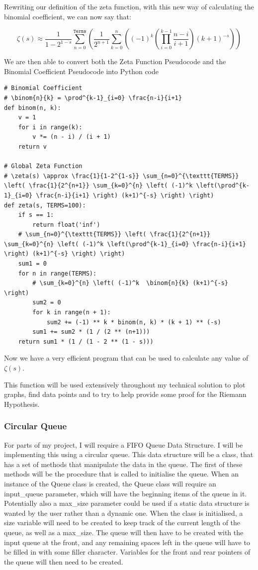 \documentclass[12pt]{article}
\begin{document}
Rewriting our definition of the zeta function, with this new way of calculating the binomial coefficient, we can now say that:

$$\zeta(s) \approx \frac{1}{1-2^{1-s}} \sum_{n=0}^{\texttt{Terms}} \left( \frac{1}{2^{n+1}} \sum_{k=0}^{n} \left( (-1)^k \left(\prod^{k-1}_{i=0} \frac{n-i}{i+1} \right) (k+1)^{-s} \right) \right)$$

We are then able to convert both the Zeta Function Pseudocode and the Binomial Coefficient Pseudocode into Python code
\begin{lstlisting}
# Binomial Coefficient
# \binom{n}{k} = \prod^{k-1}_{i=0} \frac{n-i}{i+1}
def binom(n, k):
    v = 1
    for i in range(k):
        v *= (n - i) / (i + 1)
    return v

# Global Zeta Function
# \zeta(s) \approx \frac{1}{1-2^{1-s}} \sum_{n=0}^{\texttt{TERMS}} \left( \frac{1}{2^{n+1}} \sum_{k=0}^{n} \left( (-1)^k \left(\prod^{k-1}_{i=0} \frac{n-i}{i+1} \right) (k+1)^{-s} \right) \right)
def zeta(s, TERMS=100):
    if s == 1:
        return float('inf')
    # \sum_{n=0}^{\texttt{TERMS}} \left( \frac{1}{2^{n+1}} \sum_{k=0}^{n} \left( (-1)^k \left(\prod^{k-1}_{i=0} \frac{n-i}{i+1} \right) (k+1)^{-s} \right) \right)
    sum1 = 0
    for n in range(TERMS):
        # \sum_{k=0}^{n} \left( (-1)^k  \binom{n}{k} (k+1)^{-s} \right)
        sum2 = 0
        for k in range(n + 1):
            sum2 += (-1) ** k * binom(n, k) * (k + 1) ** (-s)
        sum1 += sum2 * (1 / (2 ** (n+1)))
    return sum1 * (1 / (1 - 2 ** (1 - s)))
\end{lstlisting}

Now we have a very efficient program that can be used to calculate any value of $\zeta(s)$.

This function will be used extensively throughout my technical solution to plot graphs, find data points and to try to help provide some proof for the Riemann Hypothesis.

\subsubsection{Circular Queue}
For parts of my project, I will require a FIFO Queue Data Structure. I will be implementing this using a circular queue. This data structure will be a class, that has a set of methods that manipulate the data in the queue. The first of these methods will be the procedure that is called to initialise the queue. When an instance of the Queue class is created, the Queue class will require an input\_queue parameter, which will have the beginning items of the queue in it. Potentially also a max\_size parameter could be used if a static data structure is wanted by the user rather than a dynamic one. When the class is initialised, a size variable will need to be created to keep track of the current length of the queue, as well as a max\_size. The queue will then have to be created with the input queue at the front, and any remaining spaces left in the queue will have to be filled in with some filler character. Variables for the front and rear pointers of the queue will then need to be created.
\end{document}
